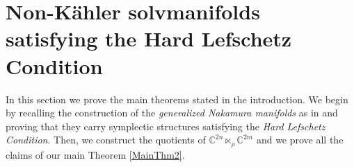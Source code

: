 \documentclass[a4paper, 11pt]{amsart}
\theoremstyle{plain}
\theoremstyle{definition}
\newcommand{\del}{\partial}
\newcommand{\delbar}{\bar{\partial}}
\DeclareMathOperator{\Ker}{Ker}
\DeclareMathOperator{\im}{Im}
\newcommand{\C}{\mathbb{C}}
\numberwithin{equation}{section}
\begin{document}
{

\section{Non-K\"ahler solvmanifolds satisfying the Hard Lefschetz Condition}
In this section we prove the main theorems stated in the introduction. We begin by recalling the construction of the \textit{generalized Nakamura manifolds} as in \cite{CT} and proving that they carry symplectic structures satisfying the \textit{Hard Lefschetz Condition}. Then, we construct the quotients of $\C^{2n} \ltimes_{\rho} \C^{2m}$ and we prove all the claims of our main Theorem \ref{MainThm2}.

}
\end{document}
